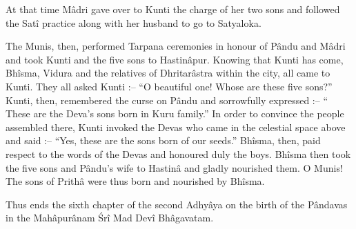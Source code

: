 At that time M\^adri gave over to Kunti the charge of her two sons and followed the Sat\^i practice along with her husband to go to Satyaloka.

The Munis, then, performed Tarpana ceremonies in honour of P\^andu and M\^adri and took Kunti and the five sons to Hastin\^apur. Knowing that Kunti has come, Bh\^isma, Vidura and the relatives of Dhritar\^astra within the city, all came to Kunti. They all asked Kunti :-- ``O beautiful one! Whose are these five sons?'' Kunti, then, remembered the curse on P\^andu and sorrowfully expressed :-- `` These are the Deva's sons born in Kuru family.'' In order to convince the people assembled there, Kunti invoked the Devas who came in the celestial space above and said :-- ``Yes, these are the sons born of our seeds.'' Bh\^isma, then, paid respect to the words of the Devas and honoured duly the boys. Bh\^isma then took the five sons and P\^andu's wife to Hastin\^a and gladly nourished them. O Munis! The sons of Prith\^a were thus born and nourished by Bh\^isma.

Thus ends the sixth chapter of the second Adhy\^aya on the birth of the P\^andavas in the Mah\^apur\^anam \'Sr\^i Mad Dev\^i Bh\^agavatam.